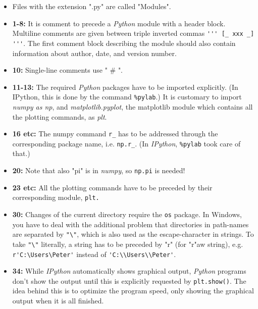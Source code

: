 \begin{itemize}
  \item Files with the extension ".py" are called "Modules".

  \item \textbf{1-8:} It is comment to precede a \emph{Python} module with a header block. Multiline comments are given between triple inverted commas \lstinline{''' [_ xxx _] '''}. The first comment block describing the module should also contain information about author, date, and version number.

  \item \textbf{10:}  Single-line comments use " \# ".

  \item \textbf{11-13:} The required \emph{Python} packages have to be imported explicitly. (In IPython, this is done by the command \lstinline{%pylab}.) It is customary to import \emph{numpy as np}, and \emph{matplotlib.pyplot}, the matplotlib module which contains all the plotting commands, as \emph{plt}.

  \item \textbf{16 etc:} The numpy command \lstinline{r_} has to be addressed through the corresponding package name, i.e. \lstinline{np.r_}. (In \emph{IPython}, \lstinline{%pylab} took care of that.)

  \item \textbf{20:}  Note that also "pi" is in \emph{numpy}, so \lstinline{np.pi} is needed!

  \item \textbf{23 etc:}  All the plotting commands have to be preceded by their corresponding module, \lstinline{plt.}

  \item \textbf{30:} Changes of the current directory require the \lstinline{os} package. In Windows, you have to deal with the additional problem that directories in path-names are separated by \lstinline{"\"}, which is also used as the escape-character in strings. To take \lstinline{"\"} literally, a string has to be preceded by "r" (for "r"aw string), e.g. \lstinline{r'C:\Users\Peter'} instead of \lstinline{'C:\\Users\\Peter'}.

  \item \textbf{34:} While \emph{IPython} automatically shows graphical output, \emph{Python} programs don't show the output until this is explicitly requested by \lstinline{plt.show()}. The idea behind this is to optimize the program speed, only showing the graphical output when it is all finished.
\end{itemize}

